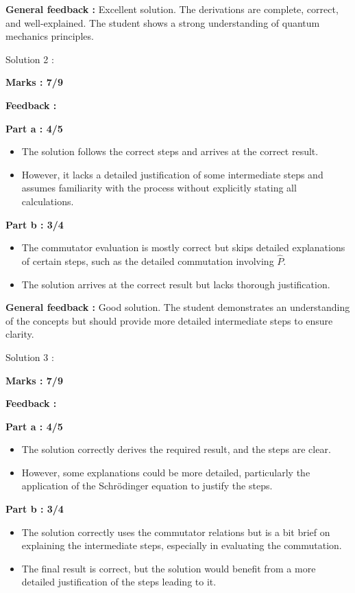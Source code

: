 \documentclass[a4paper,11pt]{article}
\begin{document}
\textbf{General feedback :}
Excellent solution. The derivations are complete, correct, and well-explained. The student shows a strong understanding of quantum mechanics principles.


Solution 2 :

\textbf{Marks : 7/9}

\textbf{Feedback :}

\textbf{Part a : 4/5}

\begin{itemize}
    \item The solution follows the correct steps and arrives at the correct result.
    \item However, it lacks a detailed justification of some intermediate steps and assumes familiarity with the process without explicitly stating all calculations.
\end{itemize}

\textbf{Part b : 3/4}

\begin{itemize}
    \item The commutator evaluation is mostly correct but skips detailed explanations of certain steps, such as the detailed commutation involving $\hat{P}$.
    \item The solution arrives at the correct result but lacks thorough justification.
\end{itemize}

\textbf{General feedback :}
Good solution. The student demonstrates an understanding of the concepts but should provide more detailed intermediate steps to ensure clarity.



Solution 3 :

\textbf{Marks : 7/9}

\textbf{Feedback :}

\textbf{Part a : 4/5}

\begin{itemize}
    \item The solution correctly derives the required result, and the steps are clear.
    \item However, some explanations could be more detailed, particularly the application of the Schrödinger equation to justify the steps.
\end{itemize}

\textbf{Part b : 3/4}

\begin{itemize}
    \item The solution correctly uses the commutator relations but is a bit brief on explaining the intermediate steps, especially in evaluating the commutation.
    \item The final result is correct, but the solution would benefit from a more detailed justification of the steps leading to it.
\end{itemize}
\end{document}
